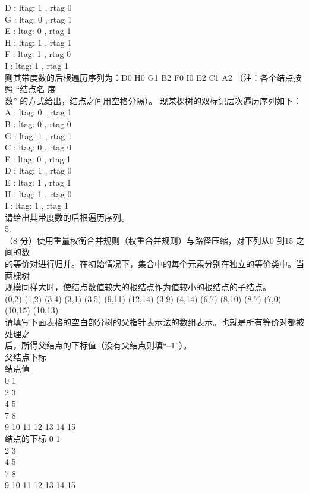 \begin{question}
D : ltag: 1 , rtag 0\\
G : ltag: 0 , rtag 1\\
E : ltag: 0 , rtag 1\\
H : ltag: 1 , rtag 1\\
F : ltag: 1 , rtag 0\\
I : ltag: 1 , rtag 1\\
则其带度数的后根遍历序列为：D0 H0 G1 B2 F0 I0 E2 C1 A2 （注：各个结点按照 “结点名 度\\
数” 的方式给出，结点之间用空格分隔）。 现某棵树的双标记层次遍历序列如下：\\
A : ltag: 0 , rtag 1\\
B : ltag: 0 , rtag 0\\
G : ltag: 1 , rtag 1\\
C : ltag: 0 , rtag 0\\
F : ltag: 0 , rtag 1\\
D : ltag: 1 , rtag 0\\
E : ltag: 1 , rtag 1\\
H : ltag: 1 , rtag 0\\
I : ltag: 1 , rtag 1\\
请给出其带度数的后根遍历序列。\\
5.\\
（8 分）使用重量权衡合并规则（权重合并规则）与路径压缩，对下列从0 到15 之间的数\\
的等价对进行归并。在初始情况下，集合中的每个元素分别在独立的等价类中。当两棵树\\
规模同样大时，使结点数值较大的根结点作为值较小的根结点的子结点。\\
(0,2) (1,2) (3,4) (3,1) (3,5) (9,11) (12,14) (3,9) (4,14) (6,7) (8,10) (8,7) (7,0) (10,15) (10,13)\\
请填写下面表格的空白部分树的父指针表示法的数组表示。也就是所有等价对都被处理之\\
后，所得父结点的下标值（没有父结点则填“–1”）。\\
父结点下标\\
结点值\\
0 1\\
2 3\\
4 5\\
7 8\\
9 10 11 12 13 14 15\\
结点的下标 0 1\\
2 3\\
4 5\\
7 8\\
9 10 11 12 13 14 15\\

\end{question}
